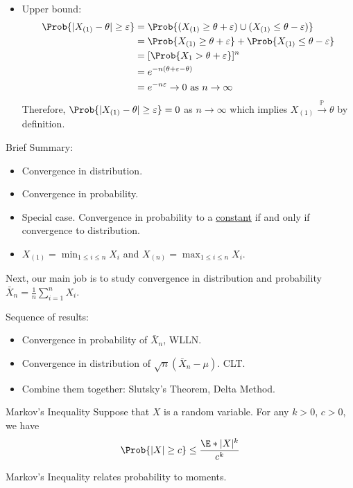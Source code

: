 \begin{Example}{}{}
\begin{itemize}
        \item Upper bound:
              \begin{align*}
                  \Prob{\abs{X_{(1)}-\theta}\ge \varepsilon}
                   & =\Prob{(X_{(1)}\ge \theta+\varepsilon)\cup
                  (X_{(1)}\le \theta-\varepsilon)}                \\
                   & =\Prob{X_{(1)}\ge \theta+\varepsilon}+
                  \Prob{X_{(1)}\le \theta-\varepsilon}            \\
                   & =[\Prob{X_1>\theta+\varepsilon}]^n           \\
                   & =e^{-n(\theta+\varepsilon-\theta)}           \\
                   & =e^{-n\varepsilon}\to 0\text{ as }n\to\infty
              \end{align*}
              Therefore, $ \Prob{\abs{X_{(1)}-\theta}\ge \varepsilon}=0 $
              as $ n\to\infty $ which implies $ X_{(1)}\stackrel{\mathbb{P}}{\to}\theta $
              by definition.
    \end{itemize}
\end{Example}
Brief Summary:
\begin{itemize}
    \item Convergence in distribution.
    \item Convergence in probability.
    \item Special case. Convergence in probability
          to a \underline{constant} if and only if convergence to distribution.
    \item $ X_{(1)}=\min_{1\le i\le n}X_i $
          and $ X_{(n)}=\max_{1\le i\le n}X_i $.
\end{itemize}
Next, our main job is to study convergence in distribution
and probability $ \bar{X}_n=\frac{1}{n} \sum_{i=1}^{n} X_i $.

Sequence of results:
\begin{itemize}
    \item Convergence in probability of $ \bar{X}_n $,
          WLLN\@.
    \item Convergence in distribution of $ \sqrt{n}(\bar{X}_n-\mu) $. CLT\@.
    \item Combine them together: Slutsky's Theorem, Delta Method.
\end{itemize}
\begin{Theorem}{Markov's Inequality}{}
    Suppose that $ X $ is a random variable. For any $ k>0 $,
    $ c>0 $, we have
    \[ \Prob{\abs{X}\ge c}\le \frac{\E*{\abs{X}^k}}{c^k}  \]
\end{Theorem}
Markov's Inequality relates probability to moments.

